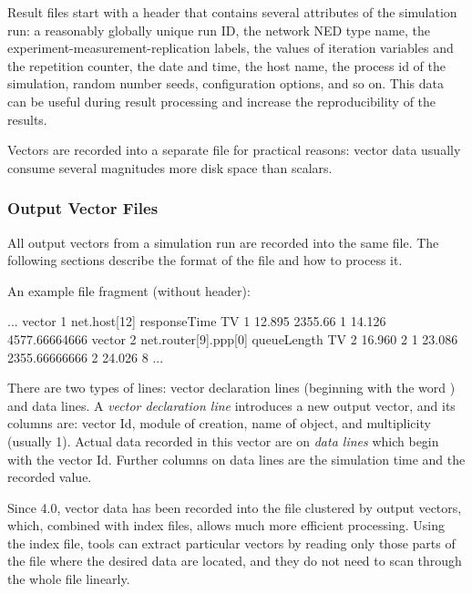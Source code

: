 Result files start with a header that contains several attributes of the
simulation run: a reasonably globally unique run ID, the network NED type
name, the experiment-measurement-replication labels, the values of
iteration variables and the repetition counter, the date and time, the host
name, the process id of the simulation, random number seeds, configuration
options, and so on. This data can be useful during result processing and
increase the reproducibility of the results.


Vectors are recorded into a separate file for practical reasons: vector
data usually consume several magnitudes more disk space than scalars.


\subsubsection{Output Vector Files}
\label{sec:ana-sim:output-vector-files}

All output vectors from a simulation run are recorded into the same file.
The following sections describe the format of the file and
how to process it.

An example file fragment (without header):

\begin{filelisting}
...
vector 1   net.host[12]  responseTime  TV
1  12.895  2355.66
1  14.126  4577.66664666
vector 2   net.router[9].ppp[0] queueLength  TV
2  16.960  2
1  23.086  2355.66666666
2  24.026  8
...
\end{filelisting}

There are two types of lines: vector declaration lines (beginning with the word
) and data lines. A \textit{vector declaration line}
introduces a new output vector, and its columns are: vector Id, module of
creation, name of  object, and multiplicity (usually 1).
Actual data recorded in this vector are on \textit{data lines} which begin
with the vector Id. Further columns on data lines are the simulation time
and the recorded value.


Since {\opp} 4.0, vector data has been recorded into the file clustered by
output vectors, which, combined with index files, allows much more
efficient processing. Using the index file, tools can extract particular
vectors by reading only those parts of the file where the desired data are
located, and they do not need to scan through the whole file linearly.


